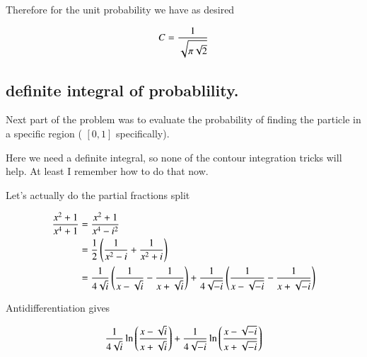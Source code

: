 \documentclass{article}
\begin{document}
Therefore for the unit probability we have as desired

\begin{align*}
C = \frac{1}{\sqrt{ \pi \sqrt{2}}}
\end{align*}

\subsection{ definite integral of probablility. }

Next part of the problem was to evaluate the probability of finding the particle in a specific region (
$[0,1]$ specifically).

Here we need a definite integral, so none of the contour integration tricks will help.  At least I remember how to do that now.

Let's actually do the partial fractions split

\begin{align*}
\frac{x^2+1}{x^4+1} 
&= \frac{x^2+1}{x^4-i^2}  \\
&= \frac{1}{2}\left( \frac{1}{x^2 - i} + \frac{1}{x^2 + i} \right) \\
&= 
\frac{1}{4\sqrt{i}}\left( 
\frac{1}{x - \sqrt{i}} 
-\frac{1}{x + \sqrt{i}} \right)
+\frac{1}{4\sqrt{-i}}\left( 
\frac{1}{x - \sqrt{-i}} 
-\frac{1}{x + \sqrt{-i}} 
\right)
\end{align*}

Antidifferentiation gives

\begin{align*}
\frac{1}{4\sqrt{i}} \ln\left({\frac{x - \sqrt{i}}{x + \sqrt{i}}}\right)
+\frac{1}{4\sqrt{-i}}\ln\left( \frac{x - \sqrt{-i}}{x + \sqrt{-i}} \right) \\
\end{align*}
\end{document}
